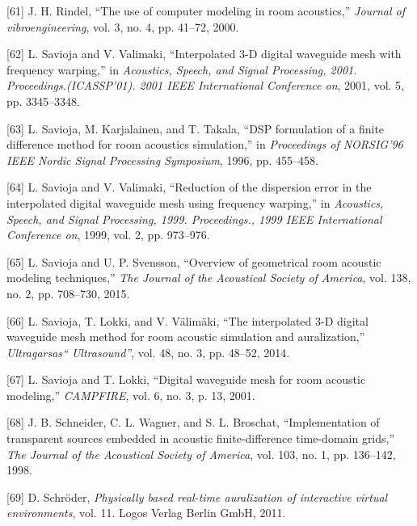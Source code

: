 \documentclass[]{scrreprt}
\begin{document}
\hypertarget{ref-rindelux5fuseux5f2000}{}
{[}61{]} J. H. Rindel, ``The use of computer modeling in room
acoustics,'' \emph{Journal of vibroengineering}, vol. 3, no. 4, pp.
41--72, 2000.

\hypertarget{ref-saviojaux5finterpolatedux5f2001}{}
{[}62{]} L. Savioja and V. Valimaki, ``Interpolated 3-D digital
waveguide mesh with frequency warping,'' in \emph{Acoustics, Speech, and
Signal Processing, 2001. Proceedings.(ICASSP'01). 2001 IEEE
International Conference on}, 2001, vol. 5, pp. 3345--3348.

\hypertarget{ref-saviojaux5fdspux5f1996}{}
{[}63{]} L. Savioja, M. Karjalainen, and T. Takala, ``DSP formulation of
a finite difference method for room acoustics simulation,'' in
\emph{Proceedings of NORSIG'96 IEEE Nordic Signal Processing Symposium},
1996, pp. 455--458.

\hypertarget{ref-saviojaux5freductionux5f1999}{}
{[}64{]} L. Savioja and V. Valimaki, ``Reduction of the dispersion error
in the interpolated digital waveguide mesh using frequency warping,'' in
\emph{Acoustics, Speech, and Signal Processing, 1999. Proceedings., 1999
IEEE International Conference on}, 1999, vol. 2, pp. 973--976.

\hypertarget{ref-saviojaux5foverviewux5f2015}{}
{[}65{]} L. Savioja and U. P. Svensson, ``Overview of geometrical room
acoustic modeling techniques,'' \emph{The Journal of the Acoustical
Society of America}, vol. 138, no. 2, pp. 708--730, 2015.

\hypertarget{ref-saviojaux5finterpolatedux5f2014}{}
{[}66{]} L. Savioja, T. Lokki, and V. Välimäki, ``The interpolated 3-D
digital waveguide mesh method for room acoustic simulation and
auralization,'' \emph{Ultragarsas`` Ultrasound''}, vol. 48, no. 3, pp.
48--52, 2014.

\hypertarget{ref-saviojaux5fdigitalux5f2001}{}
{[}67{]} L. Savioja and T. Lokki, ``Digital waveguide mesh for room
acoustic modeling,'' \emph{CAMPFIRE}, vol. 6, no. 3, p. 13, 2001.

\hypertarget{ref-schneiderux5fimplementationux5f1998}{}
{[}68{]} J. B. Schneider, C. L. Wagner, and S. L. Broschat,
``Implementation of transparent sources embedded in acoustic
finite-difference time-domain grids,'' \emph{The Journal of the
Acoustical Society of America}, vol. 103, no. 1, pp. 136--142, 1998.

\hypertarget{ref-schroderux5fphysicallyux5f2011}{}
{[}69{]} D. Schröder, \emph{Physically based real-time auralization of
interactive virtual environments}, vol. 11. Logos Verlag Berlin GmbH,
2011.
\end{document}
